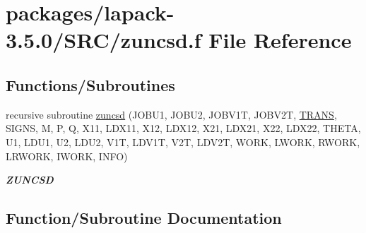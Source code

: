 \hypertarget{zuncsd_8f}{}\section{packages/lapack-\/3.5.0/\+S\+R\+C/zuncsd.f File Reference}
\label{zuncsd_8f}
\subsection*{Functions/\+Subroutines}
\begin{DoxyCompactItemize}
\item 
recursive subroutine \hyperlink{zuncsd_8f_a774109f03e11c18f564494b2fe96ac41}{zuncsd} (J\+O\+B\+U1, J\+O\+B\+U2, J\+O\+B\+V1\+T, J\+O\+B\+V2\+T, \hyperlink{superlu__enum__consts_8h_a0c4e17b2d5cea33f9991ccc6a6678d62a1f61e3015bfe0f0c2c3fda4c5a0cdf58}{T\+R\+A\+N\+S}, S\+I\+G\+N\+S, M, P, Q, X11, L\+D\+X11, X12, L\+D\+X12, X21, L\+D\+X21, X22, L\+D\+X22, T\+H\+E\+T\+A, U1, L\+D\+U1, U2, L\+D\+U2, V1\+T, L\+D\+V1\+T, V2\+T, L\+D\+V2\+T, W\+O\+R\+K, L\+W\+O\+R\+K, R\+W\+O\+R\+K, L\+R\+W\+O\+R\+K, I\+W\+O\+R\+K, I\+N\+F\+O)
\begin{DoxyCompactList}\small\item\em {\bfseries Z\+U\+N\+C\+S\+D} \end{DoxyCompactList}\end{DoxyCompactItemize}


\subsection{Function/\+Subroutine Documentation}
\hypertarget{zuncsd_8f_a774109f03e11c18f564494b2fe96ac41}{}
